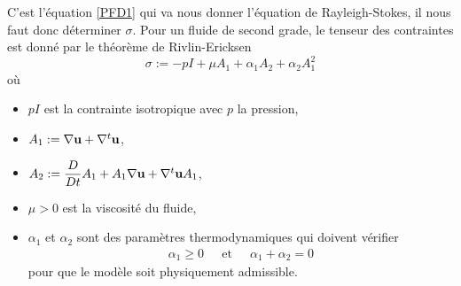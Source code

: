 C'est l'équation \eqref{PFD1} qui va nous donner l'équation de Rayleigh-Stokes, il nous faut donc déterminer $\sigma$. Pour un fluide de second grade, le tenseur des contraintes est donné par le théorème de Rivlin-Ericksen 
\begin{equation*}
    \sigma := -pI + \mu A_1 + \alpha_1 A_2 + \alpha_2 A_1^2
\end{equation*}
où
\begin{itemize}
    \item $pI$ est la contrainte isotropique avec $p$ la pression,
    \item $A_1 := \nabla \bm{\mathrm{u}} + \nabla^t \bm{\mathrm{u}}$,
    \item $A_2 := \dfrac{D}{Dt}A_1 + A_1\nabla \bm{\mathrm{u}} + \nabla^t\bm{\mathrm{u}} A_1$,
    \item $\mu >0$ est la viscosité du fluide,
    \item $\alpha_1$ et $\alpha_2$ sont des paramètres thermodynamiques qui doivent vérifier 
    \begin{eqnarray*}
        \alpha_1 \geq 0 \ \ \ \ \ \text{ et } \ \ \ \ \ \alpha_1 + \alpha_2 = 0
    \end{eqnarray*}
    pour que le modèle soit physiquement admissible.
\end{itemize}

